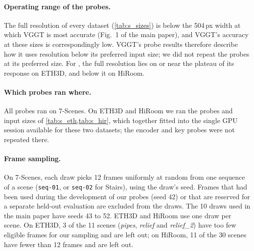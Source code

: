 \documentclass[10pt,twocolumn,letterpaper]{article}
\begin{document}
\paragraph{Operating range of the probes.}
The full resolution of every dataset (\cref{tab:s_sizes}) is below the 504\,px width at which VGGT is most accurate (Fig.~1 of the main paper), and VGGT's accuracy at these sizes is correspondingly low. VGGT's probe results therefore describe how it uses resolution below its preferred input size; we did not repeat the probes at its preferred size. For \pithree, the full resolution lies on or near the plateau of its response on ETH3D, and below it on HiRoom.

\paragraph{Which probes ran where.}
All probes ran on 7-Scenes. On ETH3D and HiRoom we ran the probes and input sizes of \cref{tab:s_eth,tab:s_hir}, which together fitted into the single GPU session available for these two datasets; the encoder and key probes were not repeated there.

\paragraph{Frame sampling.}
On 7-Scenes, each draw picks 12 frames uniformly at random from one sequence of a scene (\texttt{seq-01}, or \texttt{seq-02} for Stairs), using the draw's seed. Frames that had been used during the development of our probes (seed 42) or that are reserved for a separate held-out evaluation are excluded from the draws. The 10 draws used in the main paper have seeds 43 to 52. ETH3D and HiRoom use one draw per scene. On ETH3D, 3 of the 11 scenes (\emph{pipes}, \emph{relief} and \emph{relief\_2}) have too few eligible frames for our sampling and are left out; on HiRoom, 11 of the 30 scenes have fewer than 12 frames and are left out.
\end{document}
